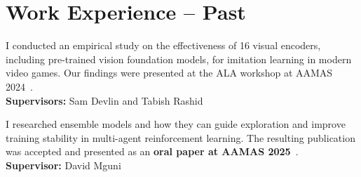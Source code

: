 \documentclass[a4paper,12pt]{article}
\begin{document}
\section{Work Experience -- Past}

\begin{expblock}
    I conducted an empirical study on the effectiveness of 16 visual encoders, including pre-trained vision foundation models, for imitation learning in modern video games. Our findings were presented at the ALA workshop at AAMAS 2024~\cite{schaefer2025visual}.\\
    \textbf{Supervisors:} Sam Devlin and Tabish Rashid
\end{expblock}

\begin{expblock}
    I researched ensemble models and how they can guide exploration and improve training stability in multi-agent reinforcement learning. The resulting publication was accepted and presented as an \textbf{oral paper at AAMAS 2025}~\cite{schaefer2025emax}.\\
    \textbf{Supervisor:} David Mguni
\end{expblock}
\end{document}
